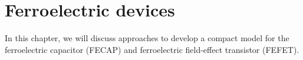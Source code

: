 \chapter{Ferroelectric devices}

In this chapter, we will discuss approaches to develop a compact model for the ferroelectric capacitor (FECAP) and ferroelectric field-effect transistor (FEFET).




